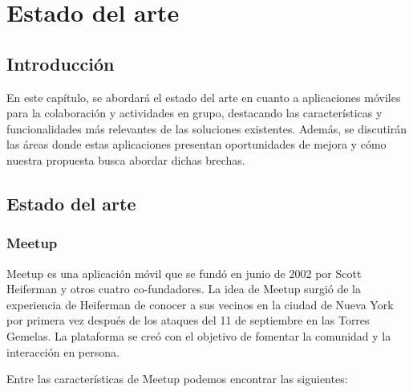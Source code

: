 \chapter{Estado del arte}
\section{Introducción}
En este capítulo, se abordará el estado del arte en
cuanto a aplicaciones móviles para la colaboración y
actividades en grupo, destacando las características y
funcionalidades más relevantes de las soluciones existentes.
Además, se discutirán las áreas donde estas aplicaciones
presentan oportunidades de mejora y cómo nuestra propuesta
busca abordar dichas brechas.

\section{Estado del arte}
\subsection{Meetup}
Meetup es una aplicación móvil que se fundó en junio de 2002 por Scott Heiferman 
y otros cuatro co-fundadores. La idea de Meetup surgió de la experiencia de Heiferman de 
conocer a sus vecinos en la ciudad de Nueva York por primera vez después de los 
ataques del 11 de septiembre en las Torres Gemelas. La plataforma se creó con el 
objetivo de fomentar la comunidad y la interacción en persona.

Entre las características de Meetup podemos encontrar las siguientes:

